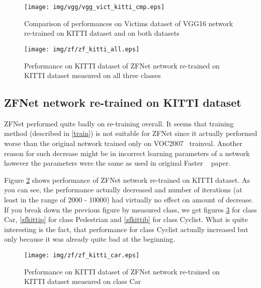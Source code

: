 \begin{figure}[!]
\texttt{[image: img/vgg/vgg\_vict\_kitti\_cmp.eps]}
\caption[Comparison of performances of VGG16 networks, Victims dataset]{Comparison of performances on Victims dataset of VGG16 network re-trained on KITTI dataset and on both datasets}
\label{vggvkcmp}
\end{figure}

\begin{figure}[!]
\texttt{[image: img/zf/zf\_kitti\_all.eps]}
\caption[Performance of ZFNet network on KITTI dataset]{Performance on KITTI dataset of ZFNet network re-trained on KITTI dataset measured on all three classes}
\label{zfkittiall}
\end{figure}
\clearpage

\subsection{ZFNet network re-trained on KITTI dataset}

ZFNet performed quite badly on re-training overall. It seems that training method (described in \ref{train}) is not suitable for ZFNet since it actually performed worse than the original network trained only on VOC2007~\cite{voc2007} trainval. Another reason for such decrease might be in incorrect learning parameters of a network however the parameters were the same as used in original Faster \rcnn~\cite{faster} paper.

Figure \ref{zfkittiall} shows performance of ZFNet network re-trained on KITTI dataset. As you can see, the performance actually decreased and number of iterations (at least in the range of 2000 - 10000) had virtually no effect on amount of decrease. If you break down the previous figure by measured class, we get figures \ref{zfkittic} for class Car, \ref{zfkittip} for class Pedestrian and \ref{zfkittib} for class Cyclist. What is quite interesting is the fact, that performance for class Cyclist actually increased but only because it was already quite bad at the beginning.


\begin{figure}[!]
\texttt{[image: img/zf/zf\_kitti\_car.eps]}
\caption[Performance of ZFNet network on KITTI dataset, class Car]{Performance on KITTI dataset of ZFNet network re-trained on KITTI dataset measured on class Car}
\label{zfkittic}
\end{figure}

